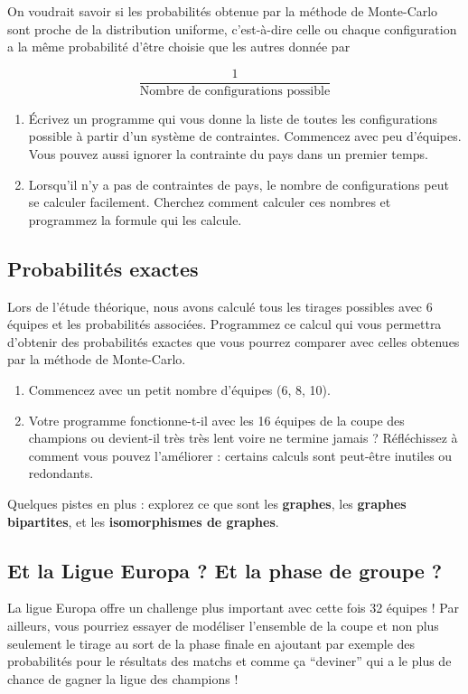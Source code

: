 \documentclass{../ficheTDTP}
\begin{document}
On voudrait savoir si les probabilités obtenue par la méthode de Monte-Carlo sont proche de la distribution uniforme, c'est-à-dire celle ou chaque configuration a la même probabilité d'être choisie que les autres donnée par

\begin{equation*}
\frac{1}{\text{Nombre de configurations possible}}
\end{equation*}

\begin{enumerate}
\item \'Ecrivez un programme qui vous donne la liste de toutes les configurations possible à partir d'un système de contraintes. Commencez avec peu d'équipes. Vous pouvez aussi ignorer la contrainte du pays dans un premier temps.
\item Lorsqu'il n'y a pas de contraintes de pays, le nombre de configurations peut se calculer facilement. Cherchez comment calculer ces nombres et programmez la formule qui les calcule.
\end{enumerate}

\subsection{Probabilités exactes}

Lors de l'étude théorique, nous avons calculé tous les tirages possibles avec 6 équipes et les probabilités associées. Programmez ce calcul qui vous permettra d'obtenir des probabilités exactes que vous pourrez comparer avec celles obtenues par la méthode de Monte-Carlo.

\begin{enumerate}
\item Commencez avec un petit nombre d'équipes (6, 8, 10).
\item Votre programme fonctionne-t-il avec les 16 équipes de la coupe des champions ou devient-il très très lent voire ne termine jamais ? Réfléchissez à comment vous pouvez l'améliorer : certains calculs sont peut-être inutiles ou redondants. 
\end{enumerate}

Quelques pistes en plus : explorez ce que sont les \textbf{graphes}, les \textbf{graphes bipartites}, et les \textbf{isomorphismes de graphes}.

\subsection{Et la Ligue Europa ? Et la phase de groupe ?}

La ligue Europa offre un challenge plus important avec cette fois 32 équipes ! Par ailleurs, vous pourriez essayer de modéliser l'ensemble de la coupe et non plus seulement le tirage au sort de la phase finale en ajoutant par exemple des probabilités pour le résultats des matchs et comme ça ``deviner'' qui a le plus de chance de gagner la ligue des champions !
\end{document}
